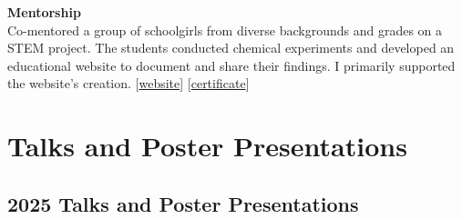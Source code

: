 \documentclass[11pt,a4paper,sans]{moderncv}        %
\begin{document}
\vspace{5pt}

\textbf{Mentorship}\\
Co-mentored a group of schoolgirls from diverse backgrounds and grades on a STEM project. 
The students conducted chemical experiments and developed an educational website to document and share their findings. 
I primarily supported the website's creation.  
[\href{https://artomaranjyan.github.io/cheminno/}{website}] [\textcolor{accent}{\href{https://artomaranjyan.github.io/assets/pdf/feminno_certificate.pdf}{certificate}}]

\vspace{5pt}



\section{Talks and Poster Presentations}




\subsection{2025 Talks and Poster Presentations}
\end{document}
